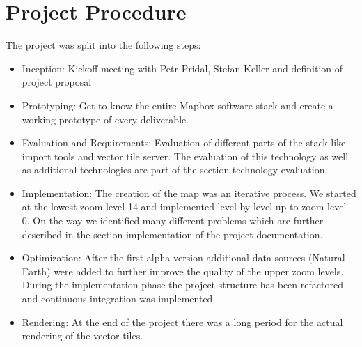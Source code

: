 \newpage
\section{Project Procedure}

The project was split into the following steps:

\begin{itemize}
\item
  Inception: Kickoff meeting with Petr Pridal, Stefan Keller and
  definition of project proposal
\item
  Prototyping: Get to know the entire Mapbox software stack and create
  a working prototype of every deliverable.
\item
  Evaluation and Requirements: Evaluation of different parts of the
  stack like import tools and vector tile server. The evaluation of
  this technology as well as additional technologies are part of the
  section technology evaluation.
\item
  Implementation: The creation of the map was an iterative process. We
  started at the lowest zoom level 14 and implemented level by level up
  to zoom level 0. On the way we identified many different problems
  which are further described in the section implementation of the
  project documentation.
\item
  Optimization: After the first alpha version
  additional data sources (Natural Earth) were added to further improve the quality
  of the upper zoom levels. During the implementation phase the project structure
  has been refactored and continuous integration was implemented.
\item
  Rendering: At the end of the project there was a long period for the
  actual rendering of the vector tiles.
\end{itemize}
\newpage